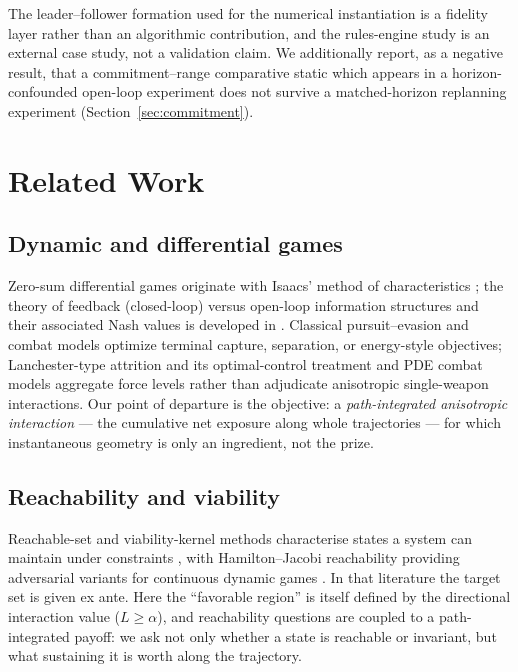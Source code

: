 \documentclass[12pt,a4paper]{article}
\begin{document}
\noindent The leader--follower formation used for the numerical
instantiation is a fidelity layer rather than an algorithmic contribution,
and the rules-engine study is an external case study, not a validation claim.
We additionally report, as a negative result, that a commitment--range
comparative static which appears in a horizon-confounded open-loop
experiment does not survive a matched-horizon replanning experiment
(Section~\ref{sec:commitment}).

\section{Related Work}\label{sec:related}

\subsection{Dynamic and differential games}
Zero-sum differential games originate with Isaacs' method of characteristics
\cite{isaacs1965}; the theory of feedback (closed-loop) versus open-loop
information structures and their associated Nash values is developed in
\cite{basar1999}.  Classical pursuit--evasion and combat models optimize
terminal capture, separation, or energy-style objectives; Lanchester-type
attrition and its optimal-control treatment \cite{taylor1974} and
PDE combat models \cite{protopopescu1989} aggregate force levels rather
than adjudicate anisotropic single-weapon interactions.  Our point of
departure is the objective: a \emph{path-integrated anisotropic
interaction} --- the cumulative net exposure along whole trajectories ---
for which instantaneous geometry is only an ingredient, not the prize.

\subsection{Reachability and viability}
Reachable-set and viability-kernel methods characterise states a system
can maintain under constraints \cite{aubin1991}, with Hamilton--Jacobi
reachability providing adversarial variants for continuous dynamic games
\cite{mitchell2005}.  In that literature the target set is given ex
ante.  Here the ``favorable region'' is itself defined by the directional
interaction value ($L\ge\alpha$), and reachability questions are coupled
to a path-integrated payoff: we ask not only whether a state is reachable
or invariant, but what sustaining it is worth along the trajectory.
\end{document}
